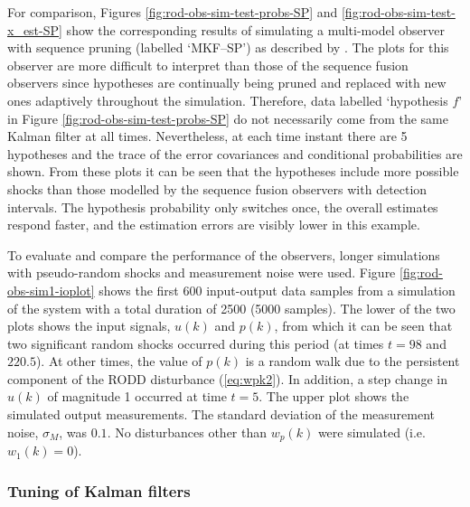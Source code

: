 For comparison, Figures \ref{fig:rod-obs-sim-test-probs-SP} and \ref{fig:rod-obs-sim-test-x_est-SP} show the corresponding results of simulating a multi-model observer with sequence pruning (labelled `MKF--SP') as described by \cite{eriksson_classification_1996}. The plots for this observer are more difficult to interpret than those of the sequence fusion observers since hypotheses are continually being pruned and replaced with new ones adaptively throughout the simulation. Therefore, data labelled `hypothesis $f$' in Figure \ref{fig:rod-obs-sim-test-probs-SP} do not necessarily come from the same Kalman filter at all times. Nevertheless, at each time instant there are 5 hypotheses and the trace of the error covariances and conditional probabilities are shown. From these plots it can be seen that the hypotheses include more possible shocks than those modelled by the sequence fusion observers with detection intervals. The hypothesis probability only switches once, the overall estimates respond faster, and the estimation errors are visibly lower in this example.

To evaluate and compare the performance of the observers, longer simulations with pseudo-random shocks and measurement noise were used. Figure \ref{fig:rod-obs-sim1-ioplot} shows the first 600 input-output data samples from a simulation of the system with a total duration of 2500 (5000 samples). The lower of the two plots shows the input signals, $u(k)$ and $p(k)$, from which it can be seen that two significant random shocks occurred during this period (at times $t=98$ and $220.5$). At other times, the value of $p(k)$ is a random walk due to the persistent component of the RODD disturbance (\ref{eq:wpk2}). In addition, a step change in $u(k)$ of magnitude 1 occurred at time $t=5$. The upper plot shows the simulated output measurements. The standard deviation of the measurement noise, $\sigma_M$, was $0.1$. No disturbances other than $w_p(k)$ were simulated (i.e. $w_1(k)=0$).

\subsubsection{Tuning of Kalman filters} \label{sim-obs-lin-1-KF-tuning}

